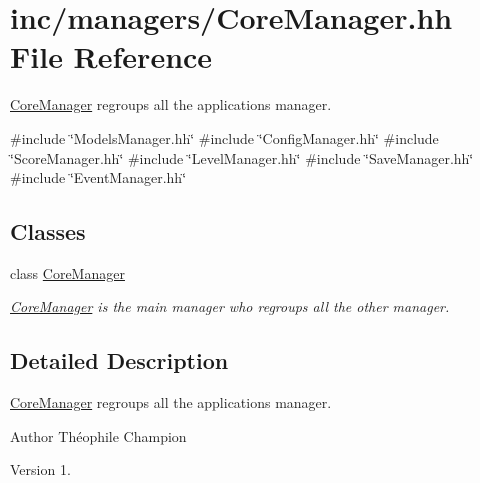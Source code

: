 \hypertarget{CoreManager_8hh}{}\section{inc/managers/\+Core\+Manager.hh File Reference}
\label{CoreManager_8hh}


\hyperlink{classCoreManager}{Core\+Manager} regroups all the application\textquotesingle{}s manager.  


{\ttfamily \#include \char`\"{}Models\+Manager.\+hh\char`\"{}}\newline
{\ttfamily \#include \char`\"{}Config\+Manager.\+hh\char`\"{}}\newline
{\ttfamily \#include \char`\"{}Score\+Manager.\+hh\char`\"{}}\newline
{\ttfamily \#include \char`\"{}Level\+Manager.\+hh\char`\"{}}\newline
{\ttfamily \#include \char`\"{}Save\+Manager.\+hh\char`\"{}}\newline
{\ttfamily \#include \char`\"{}Event\+Manager.\+hh\char`\"{}}\newline
\subsection*{Classes}
\begin{DoxyCompactItemize}
\item 
class \hyperlink{classCoreManager}{Core\+Manager}
\begin{DoxyCompactList}\small\item\em \hyperlink{classCoreManager}{Core\+Manager} is the main manager who regroups all the other manager. \end{DoxyCompactList}\end{DoxyCompactItemize}


\subsection{Detailed Description}
\hyperlink{classCoreManager}{Core\+Manager} regroups all the application\textquotesingle{}s manager. 

\begin{DoxyAuthor}{Author}
Théophile Champion 
\end{DoxyAuthor}
\begin{DoxyVersion}{Version}
1. 
\end{DoxyVersion}
